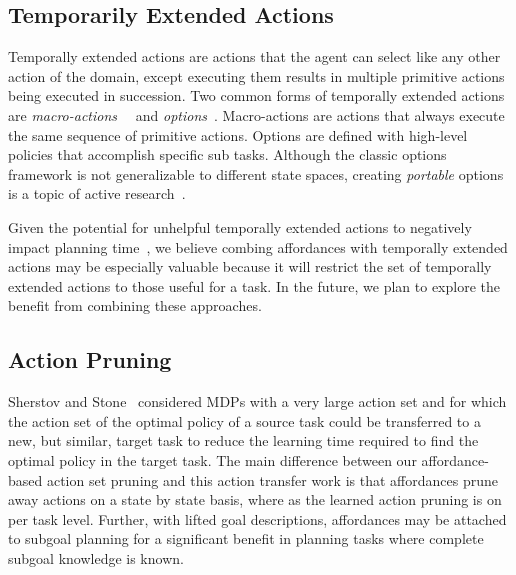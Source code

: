 \documentclass[conference]{IEEEtran}
\begin{document}
\subsection{Temporarily Extended Actions}
Temporally extended actions are actions that the agent can
select like any other action of the domain, except executing them
results in multiple primitive actions being executed in
succession. Two common forms of temporally extended actions are {\em
  macro-actions}~\citep{hauskrecht98} ~and {\em options}~\citep{sutton99}. 
Macro-actions are actions that always
execute the same sequence of primitive actions. Options are defined
with high-level policies that accomplish specific sub tasks. Although 
the classic options framework is not generalizable to different state spaces,
creating {\em portable} options is a topic of active research~\citep{konidaris07,konidaris2009efficient,Ravindran03analgebraic,croonenborghs2008learning,andre2002state,konidaris2012transfer}.


Given the potential for unhelpful temporally extended actions to negatively impact planning time~\citep{Jong:2008zr}, we believe combing affordances with temporally extended actions
may be especially valuable because it will restrict the set of temporally extended actions to those
useful for a task. In the future, we plan to explore the benefit from combining
these approaches.

\subsection{Action Pruning}

Sherstov and Stone~\citep{sherstov2005improving} considered MDPs with a very large action set and for which the action
set of the optimal policy of a source task could be transferred to a new, but similar, target
task to reduce the learning time required to find the optimal policy in the target task. The main difference between our affordance-based action set pruning and this action transfer
work is that affordances prune away actions on a state by state basis, where
as the learned action pruning is on per task level. Further, with lifted goal descriptions, affordances may be attached to subgoal planning for a significant
benefit in planning tasks where complete subgoal knowledge is known.
\end{document}
